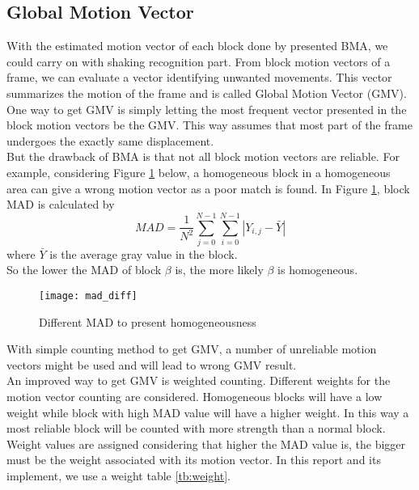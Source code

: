 \documentclass[a4paper, twocolumn]{article}
\begin{document}
	\subsection{Global Motion Vector}
	With the estimated motion vector of each block done by presented BMA, we could carry on with shaking recognition part.
	From block motion vectors of a frame, we can evaluate a vector identifying unwanted movements. This vector summarizes the motion of the frame and is called Global Motion Vector (GMV).\\
	One way to get GMV is simply letting the most frequent vector presented in the block motion vectors be the GMV. This way assumes that most part of the frame undergoes the exactly same displacement. \\
	But the drawback of BMA is that not all block motion vectors are reliable. For example, considering Figure \ref{fig:mad_diff} below, a homogeneous block in a homogeneous area can give a wrong motion vector as a poor match is found. In Figure \ref{fig:mad_diff}, block MAD is calculated by
	\begin{equation}
		MAD = \frac{1}{N^2} \sum_{j=0}^{N-1} \sum_{i=0}^{N-1} | Y_{i,j} - \bar{Y} |
	\end{equation}
	where $ \bar{Y} $ is the average gray value in the block. \\
	So the lower the MAD of block $ \beta $ is, the more likely $ \beta $ is homogeneous.
	\begin{figure}[h]
	\centering
	\texttt{[image: mad\_diff]}
	\caption{Different MAD to present homogeneousness}
	\label{fig:mad_diff}
	\end{figure}
	
	\noindent
	With simple counting method to get GMV, a number of unreliable motion vectors might be used and will lead to wrong GMV result.\\
	An improved way to get GMV is weighted counting. Different weights for the motion vector counting are considered. Homogeneous blocks will have a low weight while block with high MAD value will have a higher weight. In this way a most reliable block will be counted with more strength than a normal block.\\
	Weight values are assigned considering that higher the MAD value is, the bigger must be the weight associated with its motion vector. In this report and its implement, we use a weight table \ref{tb:weight}.
	
\end{document}
